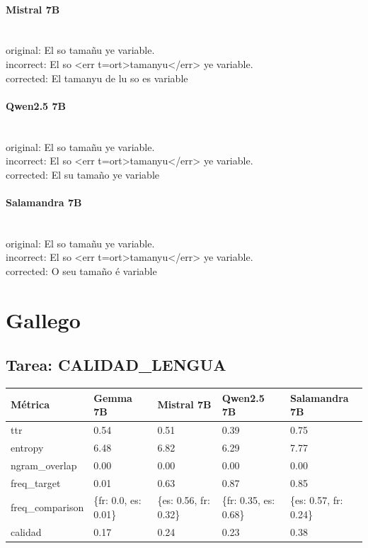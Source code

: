 \paragraph{Mistral 7B}~\\
{original:} El so tamañu ye variable.\\
{incorrect:} El so {\textless}err t=ort{\textgreater}tamanyu{\textless}/err{\textgreater} ye variable.\\
{corrected:} El tamanyu de lu so es variable\\

\paragraph{Qwen2.5 7B}~\\
{original:} El so tamañu ye variable.\\
{incorrect:} El so {\textless}err t=ort{\textgreater}tamanyu{\textless}/err{\textgreater} ye variable.\\
{corrected:} El su tamaño ye variable\\

\paragraph{Salamandra 7B}~\\
{original:} El so tamañu ye variable.\\
{incorrect:} El so {\textless}err t=ort{\textgreater}tamanyu{\textless}/err{\textgreater} ye variable.\\
{corrected:} O seu tamaño é variable\\

\section{Gallego}

\subsection{Tarea: CALIDAD\_LENGUA}\label{tarea-calidad_lengua}
{\def\LTcaptype{none}
\begin{longtable}[]{@{}lllll@{}}
\toprule\noalign{}
Métrica & Gemma 7B & Mistral 7B & Qwen2.5 7B & Salamandra 7B \\
\midrule\noalign{}
\endhead
\bottomrule\noalign{}
\endlastfoot
ttr & 0.54 & 0.51 & 0.39 & 0.75 \\
entropy & 6.48 & 6.82 & 6.29 & 7.77 \\
ngram\_overlap & 0.00 & 0.00 & 0.00 & 0.00 \\
freq\_target & 0.01 & 0.63 & 0.87 & 0.85 \\
freq\_comparison & \{\textquotesingle{}fr\textquotesingle{}: 0.0, \textquotesingle{}es\textquotesingle{}: 0.01\} & \{\textquotesingle{}es\textquotesingle{}: 0.56, \textquotesingle{}fr\textquotesingle{}: 0.32\} & \{\textquotesingle{}fr\textquotesingle{}: 0.35, \textquotesingle{}es\textquotesingle{}: 0.68\} & \{\textquotesingle{}es\textquotesingle{}: 0.57, \textquotesingle{}fr\textquotesingle{}: 0.24\} \\
calidad & 0.17 & 0.24 & 0.23 & 0.38 \\
\end{longtable}}

